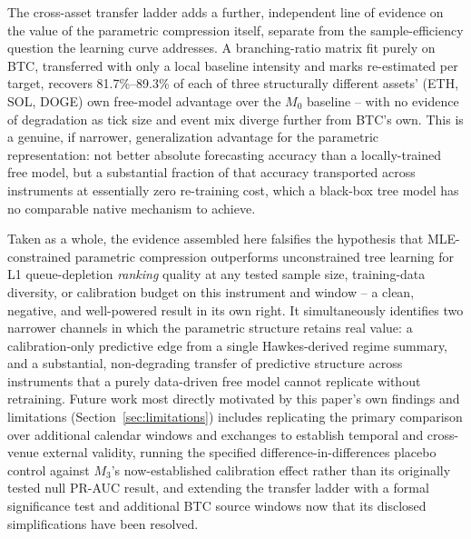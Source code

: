 The cross-asset transfer ladder adds a further, independent line of
evidence on the value of the parametric compression itself, separate
from the sample-efficiency question the learning curve addresses. A
branching-ratio matrix fit purely on BTC, transferred with only a local
baseline intensity and marks re-estimated per target, recovers 81.7\%--89.3\%
of each of three structurally different assets' (ETH, SOL, DOGE) own
free-model advantage over the $M_0$ baseline -- with no evidence of
degradation as tick size and event mix diverge further from BTC's own.
This is a genuine, if narrower, generalization advantage for the
parametric representation: not better absolute forecasting accuracy than
a locally-trained free model, but a substantial fraction of that
accuracy transported across instruments at essentially zero re-training
cost, which a black-box tree model has no comparable native mechanism to
achieve.

Taken as a whole, the evidence assembled here falsifies the hypothesis
that MLE-constrained parametric compression outperforms unconstrained
tree learning for L1 queue-depletion \emph{ranking} quality at any tested
sample size, training-data diversity, or calibration budget on this
instrument and window -- a clean, negative, and well-powered result in
its own right. It simultaneously identifies two narrower channels in
which the parametric structure retains real value: a calibration-only
predictive edge from a single Hawkes-derived regime summary, and a
substantial, non-degrading transfer of predictive structure across
instruments that a purely data-driven free model cannot replicate
without retraining. Future work most directly motivated by this paper's
own findings and limitations
(Section~\ref{sec:limitations}) includes replicating the primary
comparison over additional calendar windows and exchanges to establish
temporal and cross-venue external validity, running the specified
difference-in-differences placebo control against $M_3$'s
now-established calibration effect rather than its originally tested
null PR-AUC result, and extending the transfer ladder with a formal
significance test and additional BTC source windows now that its
disclosed simplifications have been resolved.
